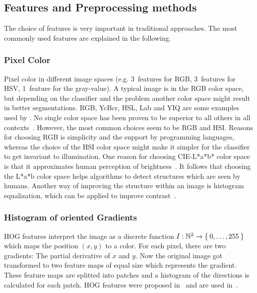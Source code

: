 
\subsection{Features and Preprocessing methods}\label{subsec:features}%
The choice of features is very important in traditional approaches.
The most commonly used features are explained in the following.

\subsubsection{Pixel Color}
Pixel color in different image spaces (e.g. 3~features for RGB, 3~features for
HSV, 1~feature for the gray-value). A typical image is in the RGB color space,
but depending on the classifier and the problem another color space might
result in better segmentations. RGB, YcBcr, HSL, Lab and YIQ are some examples
used by \cite{cohen2015memory}. No single color space has been proven to be
superior to all others in all contexts~\cite{cheng2001color}. However, the most
common choices seem to be RGB and HSI. Reasons for choosing RGB is simplicity
and the support by programming languages, whereas the choice of the HSI color
space might make it simpler for the classifier to get invariant to
illumination. One reason for choosing CIE-L*a*b* color space is that it
approximates human perception of brightness~\cite{kasson1992analysis}. It
follows that choosing the L*a*b color space helps algorithms to detect
structures which are seen by humans. Another way of improving the structure
within an image is histogram equalization, which can be applied to improve
contrast~\cite{pizer1987adaptive,4228537}.

\subsubsection{Histogram of oriented Gradients}
\Gls{HOG} features interpret the image as a discrete function
$I: \mathbb{N}^2 \rightarrow \Set{0, \dots, 255}$ which maps the position $(x,
y)$ to a color. For each pixel, there are two gradients: The partial derivative
of $x$ and $y$. Now the original image got transformed to two feature maps of
equal size which represents the gradient. These feature maps are splitted into
patches and a histogram of the directions is calculated for each patch.
\gls{HOG} features were proposed in~\cite{1467360} and are used
in~\cite{bourdev2010detecting,felzenszwalb2010object}.


